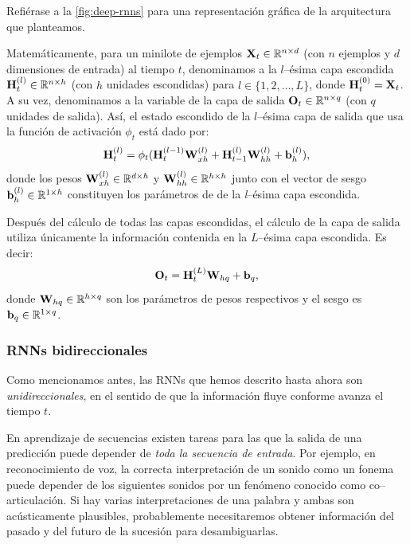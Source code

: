 \documentclass[12pt]{article}
\newcommand{\R}{\mathbb{R}}
\newcommand{\X}{\bm{\textbf X}}
\newcommand{\hi}{\bm{\textbf H}}
\newcommand{\we}{\bm{\textbf W}}
\newcommand{\bi}{\bm{\textbf b}}
\newcommand{\out}{\bm{\textbf O}}
\begin{document}
Refiérase a la \cref{fig:deep-rnns} para una representación gráfica de la arquitectura que planteamos.

Matemáticamente, para un minilote de ejemplos $ \X_t \in \R^{n \times d} $ (con $ n $ ejemplos y $ d $ dimensiones de entrada) al tiempo $ t $, denominamos a la $ l $--ésima capa escondida $ \hi_t^{(l)} \in \R^{n \times h} $ (con $ h $ unidades escondidas) para $ l \in \{1, 2, \ldots, L\} $, donde $ \hi_t^{(0)} = \X_t $. A su vez, denominamos a la variable de la capa de salida $ \out_t \in \R^{n \times q} $ (con $ q $ unidades de salida). Así, el estado escondido de la $ l $--ésima capa de salida que usa la función de activación $ \phi_t $ está dado por:
\begin{equation}
    \hi_t^{(l)} = \phi_t(\hi_t^{(l-1)}\we_{xh}^{(l)} + \hi_{t-1}^{(l)}\we_{hh}^{(l)} + \bi_h^{(l)}),
\end{equation}
donde los pesos $ \we_{xh}^{(l)} \in \R^{d\times h} $ y $ \we_{hh}^{(l)} \in \R^{h \times h} $ junto con el vector de sesgo $ \bi_h^{(l)} \in \R^{1 \times h} $ constituyen los parámetros de de la \textit{l}--ésima capa escondida.

Después del cálculo de todas las capas escondidas, el cálculo de la capa de salida utiliza únicamente la información contenida en la $ L $--ésima capa escondida. Es decir:
\begin{equation}
    \out_t = \hi_t^{(L)}\we_{hq} + \bi_q,
\end{equation}
donde $ \we_{hq} \in \R^{h \times q} $ son los parámetros de pesos respectivos y el sesgo es $ \bi_q \in \R^{1 \times q} $.

\subsubsection{RNNs bidireccionales}

Como mencionamos antes, las RNNs que hemos descrito hasta ahora son \textit{unidireccionales}, en el sentido de que la información fluye conforme avanza el tiempo $ t $.

En aprendizaje de secuencias existen tareas para las que la salida de una predicción puede depender de \textit{toda la secuencia de entrada}. Por ejemplo, en reconocimiento de voz, la correcta interpretación de un sonido como un fonema puede depender de los siguientes sonidos por un fenómeno conocido como co--articulación. Si hay varias interpretaciones de una palabra y ambas son acústicamente plausibles, probablemente necesitaremos obtener información del pasado y del futuro de la sucesión para desambiguarlas. 
\end{document}
